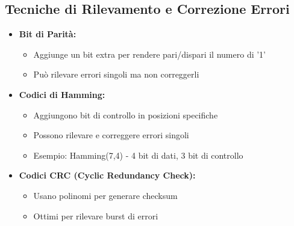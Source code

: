 \subsection{Tecniche di Rilevamento e Correzione Errori}
\begin{itemize}
    \item \textbf{Bit di Parità:}
    \begin{itemize}
        \item Aggiunge un bit extra per rendere pari/dispari il numero di '1'
        \item Può rilevare errori singoli ma non correggerli
    \end{itemize}
    \item \textbf{Codici di Hamming:}
    \begin{itemize}
        \item Aggiungono bit di controllo in posizioni specifiche
        \item Possono rilevare e correggere errori singoli
        \item Esempio: Hamming(7,4) - 4 bit di dati, 3 bit di controllo
    \end{itemize}
    \item \textbf{Codici CRC (Cyclic Redundancy Check):}
    \begin{itemize}
        \item Usano polinomi per generare checksum
        \item Ottimi per rilevare burst di errori
    \end{itemize}
\end{itemize}


